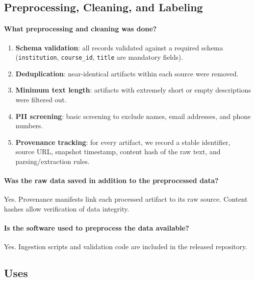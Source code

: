 \subsection{Preprocessing, Cleaning, and Labeling}

\paragraph{What preprocessing and cleaning was done?}
\begin{enumerate}
  \item \textbf{Schema validation}: all records validated against a required schema (\texttt{institution}, \texttt{course\_id}, \texttt{title} are mandatory fields).
  \item \textbf{Deduplication}: near-identical artifacts within each source were removed.
  \item \textbf{Minimum text length}: artifacts with extremely short or empty descriptions were filtered out.
  \item \textbf{PII screening}: basic screening to exclude names, email addresses, and phone numbers.
  \item \textbf{Provenance tracking}: for every artifact, we record a stable identifier, source URL, snapshot timestamp, content hash of the raw text, and parsing/extraction rules.
\end{enumerate}

\paragraph{Was the raw data saved in addition to the preprocessed data?}
Yes. Provenance manifests link each processed artifact to its raw source. Content hashes allow verification of data integrity.

\paragraph{Is the software used to preprocess the data available?}
Yes. Ingestion scripts and validation code are included in the released repository.

\subsection{Uses}

